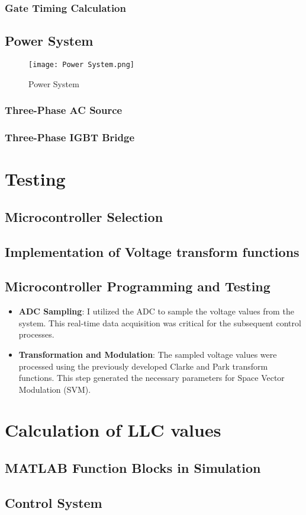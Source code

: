 \subsubsection{Gate Timing Calculation}


\subsection{Power System}
\begin{figure}[ht]
    \centering
    \texttt{[image: Power System.png]}
    \caption{Power System}
    \label{fig:Power System}
\end{figure}

\subsubsection{Three-Phase AC Source}

\subsubsection{Three-Phase IGBT Bridge}


\section{Testing}


\subsection{Microcontroller Selection}

\subsection{Implementation of Voltage transform functions}

\subsection{Microcontroller Programming and Testing}

\begin{itemize}
    \item \textbf{ADC Sampling}: I utilized the ADC to sample the voltage values from the system. This real-time data acquisition was critical for the subsequent control processes.
    \item \textbf{Transformation and Modulation}: The sampled voltage values were processed using the previously developed Clarke and Park transform functions. This step generated the necessary parameters for Space Vector Modulation (SVM).
\end{itemize}
\noindent


\section{Calculation of LLC values}

\subsection{MATLAB Function Blocks in Simulation}

\subsection{Control System}

